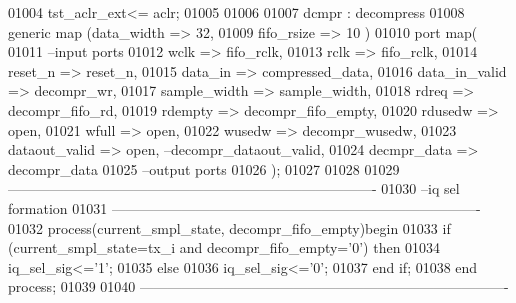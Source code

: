 \begin{DoxyCode}
01004 \textcolor{vhdlchar}{tst_aclr_ext}\textcolor{vhdlchar}{<=} \textcolor{vhdlchar}{aclr};
01005 
01006 
01007 dcmpr :  decompress 
01008   \textcolor{keywordflow}{generic} \textcolor{keywordflow}{map}  (data_width => \textcolor{vhdllogic}{32},
01009                 fifo_rsize => \textcolor{vhdllogic}{10} \textcolor{vhdlchar}{)}
01010   \textcolor{keywordflow}{port} \textcolor{keywordflow}{map}(
01011 \textcolor{keyword}{        --input ports }
01012         wclk          => fifo_rclk,  
01013         rclk          => fifo_rclk, 
01014         reset_n       => reset_n, 
01015         data_in       => compressed_data, 
01016         data_in_valid => decompr_wr, 
01017         sample_width  => sample_width,
01018         rdreq         => decompr_fifo_rd,
01019         rdempty       => decompr_fifo_empty,
01020         rdusedw       => \textcolor{keywordflow}{open}, 
01021         wfull         => \textcolor{keywordflow}{open}, 
01022         wusedw        => decompr_wusedw,
01023         dataout_valid => \textcolor{keywordflow}{open},\textcolor{keyword}{ --decompr\_dataout\_valid,  }
01024         decmpr_data   => decompr_data
01025 \textcolor{keyword}{        --output ports       }
01026         \textcolor{vhdlchar}{)};
01027  
01028  
01029 \textcolor{keyword}{-------------------------------------------------------------------------------}
01030 \textcolor{keyword}{--iq sel formation}
01031 \textcolor{keyword}{-------------------------------------------------------------------------------        }
01032 \textcolor{keywordflow}{process}(current_smpl_state, decompr_fifo_empty)\textcolor{keywordflow}{begin}
01033     \textcolor{keywordflow}{if} \textcolor{vhdlchar}{(}\textcolor{vhdlchar}{current_smpl_state}\textcolor{vhdlchar}{=}\textcolor{vhdlchar}{tx\_i} \textcolor{keywordflow}{and} \textcolor{vhdlchar}{decompr_fifo_empty}\textcolor{vhdlchar}{=}\textcolor{vhdlchar}{'}\textcolor{vhdllogic}{}\textcolor{vhdllogic}{0}\textcolor{vhdlchar}{'}\textcolor{vhdlchar}{)} \textcolor{keywordflow}{then}
01034             \textcolor{vhdlchar}{iq_sel_sig}\textcolor{vhdlchar}{<=}\textcolor{vhdlchar}{'}\textcolor{vhdllogic}{}\textcolor{vhdllogic}{1}\textcolor{vhdlchar}{'}; 
01035     \textcolor{keywordflow}{else}
01036           \textcolor{vhdlchar}{iq_sel_sig}\textcolor{vhdlchar}{<=}\textcolor{vhdlchar}{'}\textcolor{vhdllogic}{}\textcolor{vhdllogic}{0}\textcolor{vhdlchar}{'};
01037     \textcolor{keywordflow}{end} \textcolor{keywordflow}{if}; 
01038 \textcolor{keywordflow}{end} \textcolor{keywordflow}{process};
01039 
01040 \textcolor{keyword}{-------------------------------------------------------------------------------}

\end{DoxyCode}
